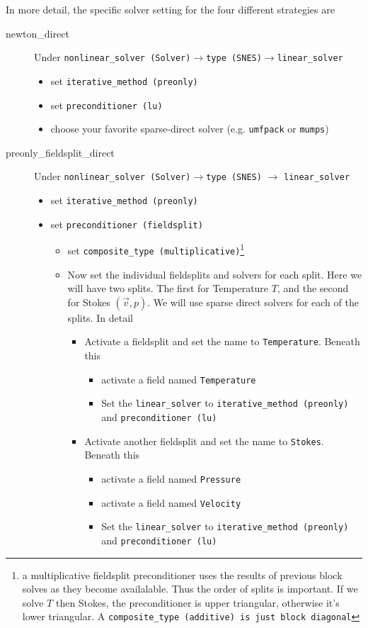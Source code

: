 In more detail, the specific solver setting for the four different
strategies are
\begin{description}
\item[newton\_direct] Under \texttt{nonlinear\_solver
    (Solver)}$\rightarrow$\texttt{type (SNES)}$\rightarrow$\texttt{linear\_solver}
  \begin{itemize}
  \item set \texttt{iterative\_method (preonly)}
  \item set \texttt{preconditioner (lu)} 
  \item choose your favorite
    sparse-direct solver (e.g. \texttt{umfpack} or \texttt{mumps})
  \end{itemize}
\item[preonly\_fieldsplit\_direct] Under \texttt{nonlinear\_solver
    (Solver)}$\rightarrow$\texttt{type (SNES)} $\rightarrow$ \texttt{linear\_solver}
  \begin{itemize}
  \item set \texttt{iterative\_method (preonly)}
  \item set \texttt{preconditioner (fieldsplit)}
    \begin{itemize}
    \item set \texttt{composite\_type (multiplicative)}\footnote{a
        multiplicative fieldsplit preconditioner uses the results of
        previous block solves as they become availalable.  Thus the
        order of splits is important.  If we solve $T$ then Stokes,
        the preconditioner is upper triangular, otherwise it's lower
        triangular.  A \texttt{composite\_type (additive) is just
          block diagonal}}
    \item Now set the individual fieldsplits and solvers for each
      split.  Here we will have two splits.  The first for Temperature
      $T$, and the second for Stokes $(\vec{v},p)$. We will use sparse
      direct solvers for each of the splits. In detail
      \begin{itemize}
      \item Activate a fieldsplit and set the name to
        \texttt{Temperature}.  Beneath this
        \begin{itemize}
      \item activate a field named
        \texttt{Temperature}
      \item Set the \texttt{linear\_solver} to
        \texttt{iterative\_method (preonly)}  and
        \texttt{preconditioner (lu)}
      \end{itemize}
      \item Activate another fieldsplit and set the name to
        \texttt{Stokes}. Beneath this
        \begin{itemize}
      \item activate a field named  \texttt{Pressure}
      \item activate a field named  \texttt{Velocity}
      \item Set the \texttt{linear\_solver} to
        \texttt{iterative\_method (preonly)}  and
        \texttt{preconditioner (lu)}
      \end{itemize}


\end{itemize}
\end{itemize}
\end{itemize}
\end{description}
